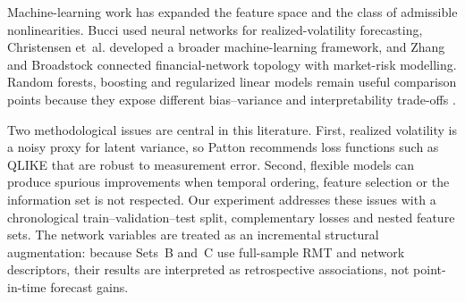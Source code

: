 Machine-learning work has expanded the feature space and the class of admissible nonlinearities. Bucci \cite{bucci_2020_realized} used neural networks for realized-volatility forecasting, Christensen et~al. \cite{christensen_2022_realized} developed a broader machine-learning framework, and Zhang and Broadstock \cite{zhang_2023_network_volatility} connected financial-network topology with market-risk modelling. Random forests, boosting and regularized linear models remain useful comparison points because they expose different bias--variance and interpretability trade-offs \cite{breiman_2001_random,friedman_2001_greedy,hoerl_kennard_1970_ridge}.

Two methodological issues are central in this literature. First, realized volatility is a noisy proxy for latent variance, so Patton \cite{patton_2011_volatility} recommends loss functions such as QLIKE that are robust to measurement error. Second, flexible models can produce spurious improvements when temporal ordering, feature selection or the information set is not respected. Our experiment addresses these issues with a chronological train--validation--test split, complementary losses and nested feature sets. The network variables are treated as an incremental structural augmentation: because Sets~B and~C use full-sample RMT and network descriptors, their results are interpreted as retrospective associations, not point-in-time forecast gains.
